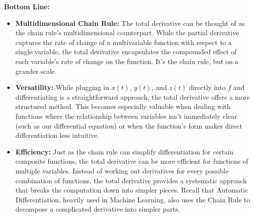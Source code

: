 \textbf{Bottom Line:}

\begin{itemize}
    \item \textbf{Multidimensional Chain Rule:} The total derivative can be thought of as the chain rule's multidimensional counterpart. While the partial derivative captures the rate of change of a multivariable function with respect to a single variable, the total derivative encapsulates the compounded effect of each variable's rate of change on the function. It's the chain rule, but on a grander scale.
    
    \item \textbf{Versatility:} While plugging in \(x(t)\), \(y(t)\), and \(z(t)\) directly into \(f\) and differentiating is a straightforward approach, the total derivative offers a more structured method. This becomes especially valuable when dealing with functions where the relationship between variables isn't immediately clear (such as our differential equation) or when the function's form makes direct differentiation less intuitive.
    
    \item \textbf{Efficiency:} Just as the chain rule can simplify differentiation for certain composite functions, the total derivative can be more efficient for functions of multiple variables. Instead of working out derivatives for every possible combination of functions, the total derivative provides a systematic approach that breaks the computation down into simpler pieces. Recall that Automatic Differentiation, heavily used in Machine Learning, also uses the Chain Rule to decompose a complicated derivative into simpler parts.
\end{itemize}

\vspace*{.2cm} 

